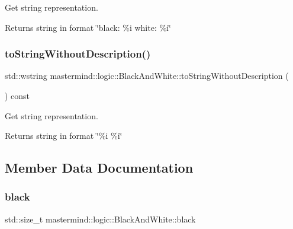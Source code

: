 Get string representation. 

\begin{DoxyReturn}{Returns}
string in format {\ttfamily \char`\"{}black\+: \%i white\+: \%i\char`\"{}} 
\end{DoxyReturn}
\hypertarget{classmastermind_1_1logic_1_1_black_and_white_a38779882fc72d356a660026e047eafb9}{}\label{classmastermind_1_1logic_1_1_black_and_white_a38779882fc72d356a660026e047eafb9} 
\subsubsection{\texorpdfstring{to\+String\+Without\+Description()}{toStringWithoutDescription()}}
{\footnotesize\ttfamily std\+::wstring mastermind\+::logic\+::\+Black\+And\+White\+::to\+String\+Without\+Description (\begin{DoxyParamCaption}{ }\end{DoxyParamCaption}) const}



Get string representation. 

\begin{DoxyReturn}{Returns}
string in format {\ttfamily \char`\"{}\%i \%i\char`\"{}} 
\end{DoxyReturn}


\subsection{Member Data Documentation}
\hypertarget{classmastermind_1_1logic_1_1_black_and_white_a63bc0b99519882a72c21afe1ac3ef2ae}{}\label{classmastermind_1_1logic_1_1_black_and_white_a63bc0b99519882a72c21afe1ac3ef2ae} 
\subsubsection{\texorpdfstring{black}{black}}
{\footnotesize\ttfamily std\+::size\+\_\+t mastermind\+::logic\+::\+Black\+And\+White\+::black\hspace{0.3cm}{\ttfamily [private]}}



